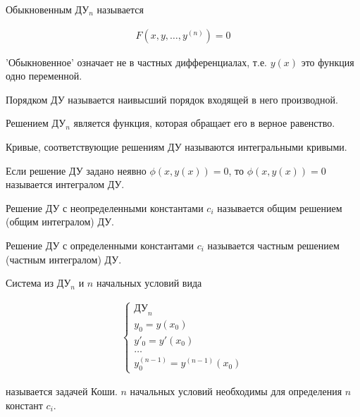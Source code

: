 
\begin{definition}
  Обыкновенным ДУ\(_{n}\) называется

  \begin{align*}
    F(x, y, \dotsc, y^{(n)}) = 0
  \end{align*}
\end{definition}

\begin{remark}
  'Обыкновенное' означает не в частных дифференциалах, т.е. \(y(x)\) это
  функция одно переменной.
\end{remark}

\begin{definition}
  Порядком ДУ называется наивысший порядок входящей в него производной.
\end{definition}

\begin{definition}
  Решением ДУ\(_{n}\) является функция, которая обращает его в верное равенство.
\end{definition}

\begin{definition}
  Кривые, соответствующие решениям ДУ называются интегральными кривыми.
\end{definition}

\begin{definition}
  Если решение ДУ задано неявно \(\phi(x, y(x)) = 0\), то 
  \(\phi(x, y(x)) = 0\) называется интегралом ДУ.
\end{definition}

\begin{definition}
  Решение ДУ с неопределенными константами \(c_{i}\) называется общим решением
  (общим интегралом) ДУ.  
\end{definition}

\begin{definition}
  Решение ДУ с определенными константами \(c_{i}\) называется частным решением
  (частным интегралом) ДУ.
\end{definition} 

\begin{definition}
  Система из ДУ\(_{n}\) и \(n\) начальных условий вида

  \begin{align*}
    \begin{cases}
      \text{ДУ}_n \\
      y_0 = y(x_0) \\
      y'_0 = y'(x_0) \\
      \dots \\
      y^{(n - 1)}_0 = y^{(n - 1)}(x_0)
    \end{cases}
  \end{align*}

  называется задачей Коши. \(n\) начальных условий необходимы для определения
  \(n\) констант \(c_{i}\).
\end{definition}

